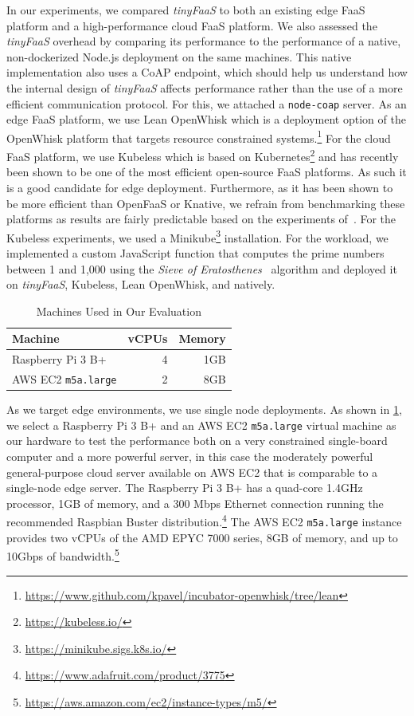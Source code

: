 In our experiments, we compared \textit{tinyFaaS} to both an existing edge FaaS platform and a high-performance cloud FaaS platform.
We also assessed the \textit{tinyFaaS} overhead by comparing its performance to the performance of a native, non-dockerized Node.js deployment on the same machines.
This native implementation also uses a CoAP endpoint, which should help us understand how the internal design of \textit{tinyFaaS} affects performance rather than the use of a more efficient communication protocol.
For this, we attached a \texttt{node-coap} server.
As an edge FaaS platform, we use Lean OpenWhisk which is a deployment option of the OpenWhisk platform that targets resource constrained systems.\footnote{\url{https://www.github.com/kpavel/incubator-openwhisk/tree/lean}}
For the cloud FaaS platform, we use Kubeless which is based on Kubernetes\footnote{\url{https://kubeless.io/}} and has recently been shown to be one of the most efficient open-source FaaS platforms.
As such it is a good candidate for edge deployment.
Furthermore, as it has been shown to be more efficient than OpenFaaS or Knative, we refrain from benchmarking these platforms as results are fairly predictable based on the experiments of~\cite{Palade2019-mo}.
For the Kubeless experiments, we used a Minikube\footnote{\url{https://minikube.sigs.k8s.io/}} installation.
For the workload, we implemented a custom JavaScript function that computes the prime numbers between 1 and 1,000 using the \textit{Sieve of Eratosthenes}~\cite{sieve} algorithm and deployed it on \textit{tinyFaaS}, Kubeless, Lean OpenWhisk, and natively.

\begin{table}[]
    \renewcommand{\arraystretch}{1.3}
    \centering
    \begin{tabular}{lrr}
        \toprule
        Machine                    & vCPUs & Memory \\
        \midrule
        Raspberry Pi 3 B+          & 4     & 1GB    \\
        AWS EC2 \texttt{m5a.large} & 2     & 8GB    \\
        \bottomrule
    \end{tabular}
    \caption{Machines Used in Our Evaluation}
    \label{tab:setup}
\end{table}

As we target edge environments, we use single node deployments.
As shown in \cref{tab:setup}, we select a Raspberry Pi 3 B+ and an AWS EC2 \texttt{m5a.large} virtual machine as our hardware to test the performance both on a very constrained single-board computer and a more powerful server, in this case the moderately powerful general-purpose cloud server available on AWS EC2 that is comparable to a single-node edge server.
The Raspberry Pi 3 B+ has a quad-core 1.4GHz processor, 1GB of memory, and a 300 Mbps Ethernet connection running the recommended Raspbian Buster distribution.\footnote{\url{https://www.adafruit.com/product/3775}}
The AWS EC2 \texttt{m5a.large} instance provides two vCPUs of the AMD EPYC 7000 series, 8GB of memory, and up to 10Gbps of bandwidth.\footnote{\url{https://aws.amazon.com/ec2/instance-types/m5/}}

